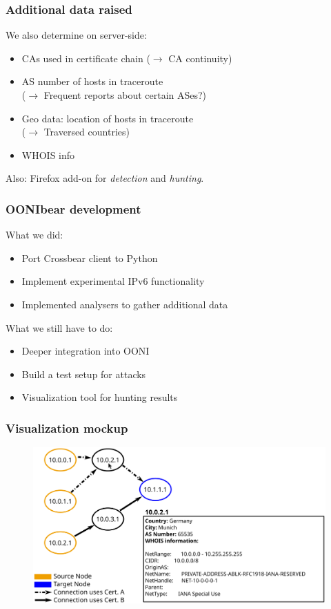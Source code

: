 \begin{frame}
  \frametitle{Additional data raised}
  \begin{block}{We also determine on server-side:}
    \begin{itemize}
    \item CAs used in certificate chain ($\rightarrow$ CA continuity)
    \item AS number of hosts in traceroute \\ ($\rightarrow$ Frequent
      reports about certain ASes?)
    \item Geo data: location of hosts in traceroute \\ ($\rightarrow$ Traversed countries)
    \item WHOIS info
    \end{itemize}
  \end{block}

  Also: Firefox add-on for \textit{detection} and \textit{hunting}.
\end{frame}

\begin{frame}
  \frametitle{OONIbear development}
  \begin{block}{What we did:}
    \begin{itemize}
    \item Port Crossbear client to Python
    \item Implement experimental IPv6 functionality
    \item Implemented analysers to gather additional data
    \end{itemize}
  \end{block}
  \begin{block}{What we still have to do:}
    \begin{itemize}
    \item Deeper integration into OONI
    \item Build a test setup for attacks
    \item Visualization tool for hunting results
    \end{itemize}
  \end{block}
\end{frame}

\begin{frame}
  \frametitle{Visualization mockup}
  \vspace{0.1\textheight}
  \begin{figure}[t]
    \centering
    \includegraphics[width=.8\textwidth]{figures/Mockup-1}
  \end{figure}
\end{frame}


